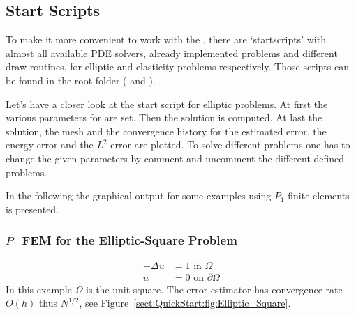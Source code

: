 \subsection{Start Scripts}
\label{sect:QuickStart:startScripts}

\noindent To make it more convenient to work with the \FFW, there are `startscripts' with almost all available PDE solvers, already implemented problems and different draw routines, for elliptic and elasticity problems respectively. Those scripts can be found in the root folder ( and ).\bigskip

\noindent Let's have a closer look at the start script for elliptic problems.
At first the various parameters for  are set. Then the solution is computed. At last the solution, the mesh and the convergence history for the estimated error, the energy error and the $L^2$ error are plotted. To solve different problems one has to change the given parameters by comment and uncomment the different defined problems.\bigskip


\noindent In the following the graphical output for some examples using $P_1$ finite elements is presented.\bigskip

\subsubsection{$P_1$ FEM for the Elliptic-Square Problem}
\begin{align*}
-\Delta u &= 1 \textrm{ in } \Omega\\
 u &= 0 \textrm{ on } \partial\Omega
\end{align*}
In this example $\Omega$ is the unit square. The error estimator 
has convergence rate $O(h)$ thus $N^{1/2}$, see Figure~\ref{sect:QuickStart:fig:Elliptic_Square}.\bigskip

